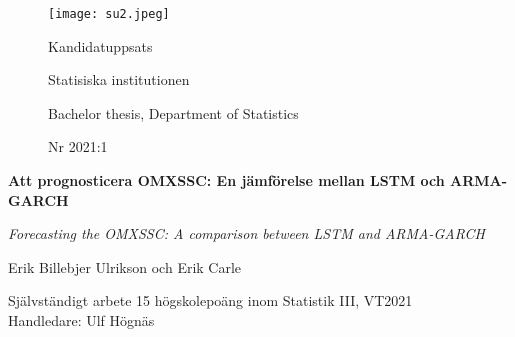 \documentclass[11pt]{article}
\numberwithin{equation}{section}
\numberwithin{table}{section}
\numberwithin{figure}{section}
\begin{document}
\begin{titlepage}
\thispagestyle{empty}
	\begin{figure}[ht]
			\texttt{[image: su2.jpeg]}
			
	   \endminipage
		 \Large Kandidatuppsats \par
		 \large Statisiska institutionen \par
		  \small Bachelor thesis, Department of   Statistics \par
		   \large Nr 2021:1 \par
			
\endminipage
\end{figure}
	
	
\centering
\vspace{5cm}

{\large\bfseries Att prognosticera OMXSSC: En jämförelse mellan LSTM och ARMA-GARCH\par}
	\vspace{0.5cm}

	
{\large\itshape Forecasting the OMXSSC: A comparison between LSTM and ARMA-GARCH \par}
	\vfill
	
	

{\Large Erik Billebjer Ulrikson och Erik Carle\par}
	\vspace{0.5cm}
	
\begin{flushleft}
Självständigt arbete 15 högskolepoäng inom Statistik III, VT2021 \\
Handledare: Ulf Högnäs\\

\end{flushleft}
\end{titlepage}

\newpage
\thispagestyle{empty}
\end{document}
